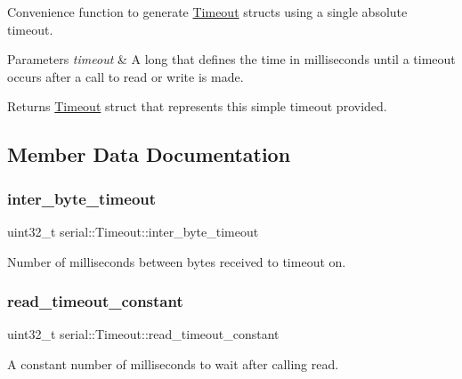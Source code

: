 Convenience function to generate \mbox{\hyperlink{structserial_1_1_timeout}{Timeout}} structs using a single absolute timeout.


\begin{DoxyParams}{Parameters}
{\em timeout} & A long that defines the time in milliseconds until a timeout occurs after a call to read or write is made.\\
\hline
\end{DoxyParams}
\begin{DoxyReturn}{Returns}
\mbox{\hyperlink{structserial_1_1_timeout}{Timeout}} struct that represents this simple timeout provided. 
\end{DoxyReturn}


\subsection{Member Data Documentation}
\mbox{\label{structserial_1_1_timeout_ada15f2a0ae478cbb62ef79d1633b2b81}} 
\subsubsection{\texorpdfstring{inter\+\_\+byte\+\_\+timeout}{inter\_byte\_timeout}}
{\footnotesize\ttfamily uint32\+\_\+t serial\+::\+Timeout\+::inter\+\_\+byte\+\_\+timeout}

Number of milliseconds between bytes received to timeout on. \mbox{\label{structserial_1_1_timeout_a099244649dec66b6e0548480edeb2b9f}} 
\subsubsection{\texorpdfstring{read\+\_\+timeout\+\_\+constant}{read\_timeout\_constant}}
{\footnotesize\ttfamily uint32\+\_\+t serial\+::\+Timeout\+::read\+\_\+timeout\+\_\+constant}

A constant number of milliseconds to wait after calling read. \mbox{\label{structserial_1_1_timeout_a64412753eb2edf1621716dd9f1a4e71e}} 

